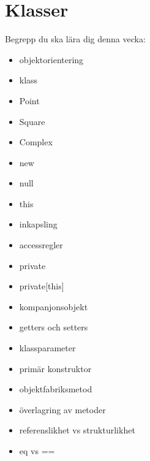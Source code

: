 \chapter{Klasser}\label{chapter:W06}
Begrepp du ska lära dig denna vecka:
\begin{itemize}[noitemsep,label={$\square$},leftmargin=*]
\item objektorientering
\item klass
\item Point
\item Square
\item Complex
\item new
\item null
\item this
\item inkapsling
\item accessregler
\item private
\item private[this]
\item kompanjonsobjekt
\item getters och setters
\item klassparameter
\item primär konstruktor
\item objektfabriksmetod
\item överlagring av metoder
\item referenslikhet vs strukturlikhet
\item eq vs ==\end{itemize}

